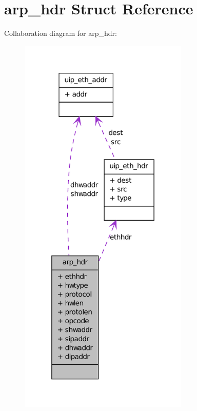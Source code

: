\hypertarget{structarp__hdr}{
\section{arp\_\-hdr Struct Reference}
\label{structarp__hdr}
}


Collaboration diagram for arp\_\-hdr:
\nopagebreak
\begin{figure}[H]
\begin{center}
\leavevmode
\includegraphics[width=229pt]{structarp__hdr__coll__graph}
\end{center}
\end{figure}

